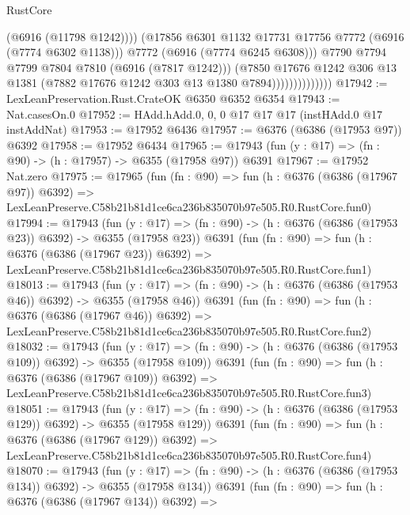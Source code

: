 \begin{lexlean}{RustCore}
\begin{coremodule}
                                    (@6916 (@11798 @1242))))
                                (@17856 @6301 @1132 @17731 @17756 @7772 (@6916 (@7774 @6302 @1138)))
                                @7772
                                (@6916 (@7774 @6245 @6308)))
                              @7790
                              @7794
                              @7799
                              @7804
                              @7810
                              (@6916 (@7817 @1242)))
                            (@7850
                              @17676
                              @1242
                              @306
                              @13
                              @1381
                              (@7882 @17676 @1242 @303 @13 @1380 @7894))))))))))))))
@17942 := LexLeanPreservation.Rust.CrateOK @6350 @6352 @6354
@17943 := Nat.casesOn.{0}
@17952 := HAdd.hAdd.{0, 0, 0} @17 @17 @17 (instHAdd.{0} @17 instAddNat)
@17953 := @17952 @6436
@17957 := @6376 (@6386 (@17953 @97)) @6392
@17958 := @17952 @6434
@17965 := @17943 (fun (y : @17) => (fn : @90) -> (h : @17957) -> @6355 (@17958 @97)) @6391
@17967 := @17952 Nat.zero
@17975 := @17965
    (fun (fn : @90) =>
    fun (h : @6376 (@6386 (@17967 @97)) @6392) =>
    LexLeanPreserve.C58b21b81d1ce6ca236b835070b97e505.R0.RustCore.fun0)
@17994 := @17943
    (fun (y : @17) => (fn : @90) -> (h : @6376 (@6386 (@17953 @23)) @6392) -> @6355 (@17958 @23))
    @6391
    (fun (fn : @90) =>
    fun (h : @6376 (@6386 (@17967 @23)) @6392) =>
    LexLeanPreserve.C58b21b81d1ce6ca236b835070b97e505.R0.RustCore.fun1)
@18013 := @17943
    (fun (y : @17) => (fn : @90) -> (h : @6376 (@6386 (@17953 @46)) @6392) -> @6355 (@17958 @46))
    @6391
    (fun (fn : @90) =>
    fun (h : @6376 (@6386 (@17967 @46)) @6392) =>
    LexLeanPreserve.C58b21b81d1ce6ca236b835070b97e505.R0.RustCore.fun2)
@18032 := @17943
    (fun (y : @17) => (fn : @90) -> (h : @6376 (@6386 (@17953 @109)) @6392) -> @6355 (@17958 @109))
    @6391
    (fun (fn : @90) =>
    fun (h : @6376 (@6386 (@17967 @109)) @6392) =>
    LexLeanPreserve.C58b21b81d1ce6ca236b835070b97e505.R0.RustCore.fun3)
@18051 := @17943
    (fun (y : @17) => (fn : @90) -> (h : @6376 (@6386 (@17953 @129)) @6392) -> @6355 (@17958 @129))
    @6391
    (fun (fn : @90) =>
    fun (h : @6376 (@6386 (@17967 @129)) @6392) =>
    LexLeanPreserve.C58b21b81d1ce6ca236b835070b97e505.R0.RustCore.fun4)
@18070 := @17943
    (fun (y : @17) => (fn : @90) -> (h : @6376 (@6386 (@17953 @134)) @6392) -> @6355 (@17958 @134))
    @6391
    (fun (fn : @90) =>
    fun (h : @6376 (@6386 (@17967 @134)) @6392) =>

\end{coremodule}
\end{lexlean}
